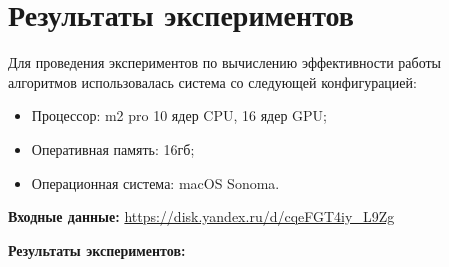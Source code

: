 \documentclass{report}
\begin{document}
\newpage

\section*{Результаты экспериментов}
Для проведения экспериментов по вычислению эффективности работы алгоритмов использовалась система со следующей конфигурацией:
\begin{itemize}
\item Процессор: m2 pro 10 ядер CPU, 16 ядер GPU;
\item Оперативная память: 16гб;
\item Операционная система: macOS Sonoma.
\end{itemize}

\par \textbf{Входные данные:} \url{https://disk.yandex.ru/d/cqeFGT4iy_L9Zg}
\par \textbf{Результаты экспериментов:}
\end{document}
